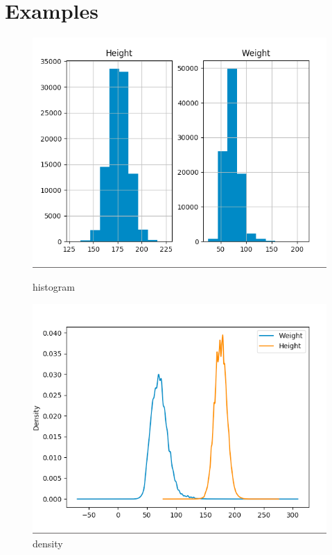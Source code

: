 \section*{Examples}

\begin{figure}[h!]
  \begin{minipage}[l]{0.49\linewidth}
    \includegraphics[scale=0.39]{assets/ex06_histogram.png}
    \caption{histogram}
  \end{minipage}
  \hfill
  \begin{minipage}[c]{0.49\linewidth}
    \includegraphics[scale=0.39]{assets/ex06_density.png}
    \caption{density}
  \end{minipage}
  

\end{figure}
